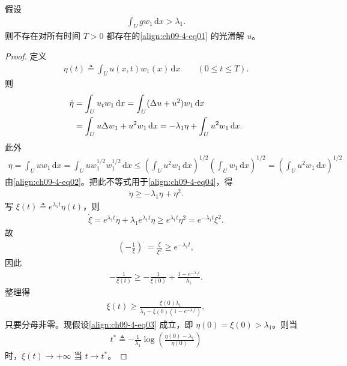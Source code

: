\documentclass[../../main.tex]{subfiles}
\begin{document}
\begin{theorem}[大初值下的爆破]\label{theorem:ch09-4-1-大初值爆破}
假设
\begin{align}
\int_U gw_1\,\mathrm{d}x>\lambda_1.\label{align:ch09-4-eq03}
\end{align}
则不存在对所有时间 $T>0$ 都存在的\eqref{align:ch09-4-eq01} 的光滑解 $u$。
\begin{proof}
定义
\begin{align*}
\eta(t)\triangleq\int_U u(x,t)w_1(x)\,\mathrm{d}x\qquad (0\leqslant t\leqslant T).
\end{align*}
则
\begin{align}
\dot\eta&=\int_U u_tw_1\,\mathrm{d}x=\int_U(\Delta u+u^2)w_1\,\mathrm{d}x\notag\\
&=\int_U u\Delta w_1+u^2w_1\,\mathrm{d}x=-\lambda_1\eta+\int_U u^2w_1\,\mathrm{d}x.\label{align:ch09-4-eq04}
\end{align}
此外
\begin{align*}
\eta=\int_U uw_1\,\mathrm{d}x=\int_U uw_1^{1/2}w_1^{1/2}\,\mathrm{d}x\leqslant\left(\int_U u^2w_1\,\mathrm{d}x\right)^{1/2}\left(\int_U w_1\,\mathrm{d}x\right)^{1/2}=\left(\int_U u^2w_1\,\mathrm{d}x\right)^{1/2}
\end{align*}
由\eqref{align:ch09-4-eq02}。把此不等式用于\eqref{align:ch09-4-eq04}，得
\begin{align}
\dot\eta\geqslant-\lambda_1\eta+\eta^2.\label{align:ch09-4-eq05}
\end{align}
写 $\xi(t)\triangleq e^{\lambda_1 t}\eta(t)$，则
\begin{align*}
\dot\xi=e^{\lambda_1 t}\dot\eta+\lambda_1e^{\lambda_1 t}\eta\geqslant e^{\lambda_1 t}\eta^2=e^{-\lambda_1 t}\xi^2.
\end{align*}
故
\begin{align*}
\left(-\frac1\xi\right)^\cdot=\frac{\dot\xi}{\xi^2}\geqslant e^{-\lambda_1 t},
\end{align*}
因此
\begin{align*}
-\frac1{\xi(t)}\geqslant-\frac1{\xi(0)}+\frac{1-e^{-\lambda_1 t}}{\lambda_1}.
\end{align*}
整理得
\begin{align*}
\xi(t)\geqslant\frac{\xi(0)\lambda_1}{\lambda_1-\xi(0)(1-e^{-\lambda_1 t})},
\end{align*}
只要分母非零。现假设\eqref{align:ch09-4-eq03} 成立，即 $\eta(0)=\xi(0)>\lambda_1$。则当
\begin{align*}
t^*\triangleq-\frac1{\lambda_1}\log\!\left(\frac{\eta(0)-\lambda_1}{\eta(0)}\right)
\end{align*}
时，$\xi(t)\to+\infty$ 当 $t\to t^*$。
\end{proof}
\end{theorem}
\end{document}

